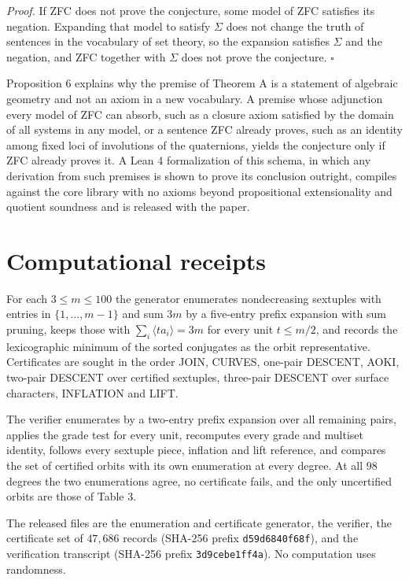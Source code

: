 \documentclass[10pt,twocolumn]{article}
\begin{document}
\emph{Proof.} If ZFC does not prove the conjecture, some model of ZFC
satisfies its negation. Expanding that model to satisfy \(\Sigma\) does
not change the truth of sentences in the vocabulary of set theory, so
the expansion satisfies \(\Sigma\) and the negation, and ZFC together
with \(\Sigma\) does not prove the conjecture. \(\square\)

Proposition 6 explains why the premise of Theorem A is a statement of
algebraic geometry and not an axiom in a new vocabulary. A premise whose
adjunction every model of ZFC can absorb, such as a closure axiom
satisfied by the domain of all systems in any model, or a sentence ZFC
already proves, such as an identity among fixed loci of involutions of
the quaternions, yields the conjecture only if ZFC already proves it. A
Lean 4 formalization of this schema, in which any derivation from such
premises is shown to prove its conclusion outright, compiles against the
core library with no axioms beyond propositional extensionality and
quotient soundness and is released with the paper.

\hypertarget{computational-receipts}{%
\section{Computational receipts}\label{computational-receipts}}

For each \(3\le m\le 100\) the generator enumerates nondecreasing
sextuples with entries in \(\{1,\dots,m-1\}\) and sum \(3m\) by a
five-entry prefix expansion with sum pruning, keeps those with
\(\sum_i\langle ta_i\rangle=3m\) for every unit \(t\le m/2\), and
records the lexicographic minimum of the sorted conjugates as the orbit
representative. Certificates are sought in the order JOIN, CURVES,
one-pair DESCENT, AOKI, two-pair DESCENT over certified sextuples,
three-pair DESCENT over surface characters, INFLATION and LIFT.

The verifier enumerates by a two-entry prefix expansion over all
remaining pairs, applies the grade test for every unit, recomputes every
grade and multiset identity, follows every sextuple piece, inflation and
lift reference, and compares the set of certified orbits with its own
enumeration at every degree. At all \(98\) degrees the two enumerations
agree, no certificate fails, and the only uncertified orbits are those
of Table 3.

The released files are the enumeration and certificate generator, the
verifier, the certificate set of \(47{,}686\) records (SHA-256 prefix
\texttt{d59d6840f68f}), and the verification transcript (SHA-256 prefix
\texttt{3d9cebe1ff4a}). No computation uses randomness.
\end{document}
